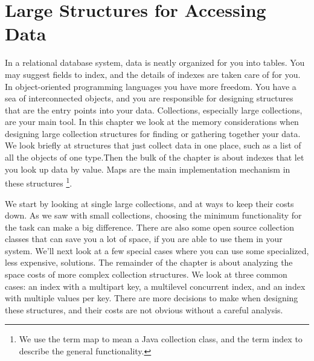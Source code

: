 \chapter{Large Structures for Accessing Data}
\label{chapter:tables-indexes}

In a relational database system, data is neatly organized for you into tables.
You may suggest fields to index, and the details of indexes are
taken care of for you. In object-oriented programming languages
you have more freedom. You have a sea of interconnected objects, and you are responsible for designing structures that are the entry points into your
data. Collections, especially large collections, are your
main tool. In this chapter we look at the memory considerations when
designing large collection structures for finding or gathering together your
data. We look briefly
at structures that just collect data in one place, such as a list
of all the objects of one type.Then the bulk of the chapter is about indexes that let you look up data by value. 
Maps are the main implementation
mechanism in these structures \footnote{We use the term map to mean a Java collection class,
and the term index to describe the general functionality.}. 

We start by looking at single large collections, and at ways to
keep their costs down. As we saw with small collections, choosing the minimum
functionality for the task can make a big difference. There are also 
some open source collection classes that can save you a lot of space, if you are
able to use them in your system. We'll next look at a few special cases where
you can use some specialized, less expensive, solutions. The
remainder of the chapter is about analyzing the space costs of more complex
collection structures.  We look at three common cases: an index with a multipart
key, a multilevel concurrent index, and an index with multiple values per key. 
There are more decisions to make when designing these structures, and their costs are
not obvious without a careful analysis. 






